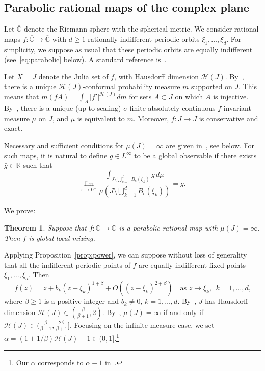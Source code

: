 \documentclass[12pt]{article}
\numberwithin{equation}{section}
\newtheorem{thm}{Theorem}[section]
\newcommand{\R}{{\mathbb R}}
\newcommand{\bC}{{\overline{\mathbb C}}}
\newcommand{\cH}{\mathcal{H}}
\newcommand{\eps}{\epsilon}
\begin{document}
\subsection{Parabolic rational maps of the complex plane}
\label{sec:parabolic}

\begin{example}
\label{ex:parabolic}
Let $\bC$ denote the Riemann sphere with the spherical metric.
We consider rational maps $f:\bC\to\bC$ with $d\ge1$ rationally indifferent periodic orbits $\xi_1,\dots,\xi_d$.
For simplicity, we suppose as usual that these periodic orbits are equally indifferent (see~\eqref{eq:parabolic} below).
A standard reference is~\cite{ADU93}.

Let $X=J$ denote the Julia set of $f$, with Hausdorff dimension $\cH(J)$.
By~\cite[Proof of Theorem~8.7]{ADU93}, there is a unique $\cH(J)$-conformal probability measure $m$ supported on $J$.
This means that $m(fA)=\int_A |f'|^{\cH(J)}dm$ for sets $A\subset J$ on which $A$ is injective.
By~\cite[Theorem~9.6]{ADU93}, there is a unique (up to scaling) $\sigma$-finite absolutely continuous $f$-invariant measure $\mu$ on $J$, and $\mu$ is equivalent to $m$. 
Moreover, $f:J\to J$ is conservative and exact.

Necessary and sufficient conditions for $\mu(J)=\infty$ are given in~\cite{ADU93}, see below.
For such maps, it is natural to define $g\in L^\infty$ to be a global observable if
there exists $\bar g\in\R$ such that
\[
\lim_{\eps\to0^+}\frac{\int_{J\setminus\bigcup_{k=1}^d B_\eps(\xi_k)}g\,d\mu}{
\mu({J\setminus\bigcup_{k=1}^d B_\eps(\xi_k)})}=\bar g.
\]

We prove:
\begin{thm} \label{thm:ADU}
Suppose that $f:\bC\to\bC$ is a parabolic rational map with $\mu(J)=\infty$.
Then $f$ is global-local mixing.
\end{thm}

Applying Proposition~\ref{prop:power}, we can suppose without loss of generality that all the indifferent periodic points of $f$ are equally indifferent fixed points $\xi_1,\dots,\xi_d$.
Then 
\begin{equation} \label{eq:parabolic}
f(z)=z+b_k(z-\xi_k)^{1+\beta}+O((z-\xi_k)^{2+\beta})
\quad\text{as $z\to\xi_k$, $\;k=1,\dots,d$,}
\end{equation} 
where $\beta\ge1$ is a positive integer and $b_k\neq0$, $k=1,\dots,d$.
By~\cite[Corollary~8.6 and Theorem~8.8]{ADU93}, $J$ has Hausdorff dimension 
$\cH(J)\in(\frac{\beta}{\beta+1},2)$.
By~\cite[Theorem~9.8]{ADU93}, $\mu(J)=\infty$ if and only if 
$\cH(J)\in(\frac{\beta}{\beta+1}, \frac{2\beta}{\beta+1}]$.
Focusing on the infinite measure case, we set
$\alpha=(1+1/\beta)\cH(J)-1\in(0,1]$.\footnote{Our $\alpha$ corresponds to $\alpha-1$ in~\cite{ADU93}.}


\end{example}
\end{document}
